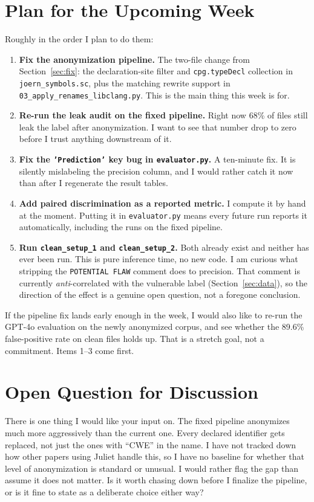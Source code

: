 \documentclass[11pt]{article}
\begin{document}
\section{Plan for the Upcoming Week}

Roughly in the order I plan to do them:

\begin{enumerate}[leftmargin=*]
  \item \textbf{Fix the anonymization pipeline.} The two-file change from
  Section~\ref{sec:fix}: the declaration-site filter and \texttt{cpg.typeDecl} collection in
  \texttt{joern\_symbols.sc}, plus the matching rewrite support in
  \texttt{03\_apply\_renames\_libclang.py}. This is the main thing this week is for.

  \item \textbf{Re-run the leak audit on the fixed pipeline.} Right now 68\% of files still leak
  the label after anonymization. I want to see that number drop to zero before I trust anything
  downstream of it.

  \item \textbf{Fix the \texttt{'Prediction'} key bug in \texttt{evaluator.py}.} A ten-minute
  fix. It is silently mislabeling the precision column, and I would rather catch it now than
  after I regenerate the result tables.

  \item \textbf{Add paired discrimination as a reported metric.} I compute it by hand at the
  moment. Putting it in \texttt{evaluator.py} means every future run reports it automatically,
  including the runs on the fixed pipeline.

  \item \textbf{Run \texttt{clean\_setup\_1} and \texttt{clean\_setup\_2}.} Both already exist
  and neither has ever been run. This is pure inference time, no new code. I am curious what
  stripping the \texttt{POTENTIAL FLAW} comment does to precision. That comment is currently
  \textit{anti}-correlated with the vulnerable label (Section~\ref{sec:data}), so the direction
  of the effect is a genuine open question, not a foregone conclusion.
\end{enumerate}

If the pipeline fix lands early enough in the week, I would also like to re-run the GPT-4o
evaluation on the newly anonymized corpus, and see whether the 89.6\% false-positive rate on
clean files holds up. That is a stretch goal, not a commitment. Items 1--3 come first.

\section{Open Question for Discussion}

There is one thing I would like your input on. The fixed pipeline anonymizes much more
aggressively than the current one. Every declared identifier gets replaced, not just the ones
with ``CWE'' in the name. I have not tracked down how other papers using Juliet handle this, so I
have no baseline for whether that level of anonymization is standard or unusual. I would rather
flag the gap than assume it does not matter. Is it worth chasing down before I finalize the
pipeline, or is it fine to state as a deliberate choice either way?
\end{document}

